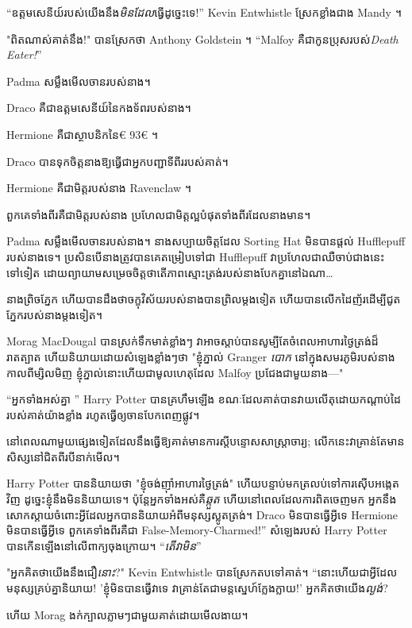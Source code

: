 {{{{“ឧត្តមសេនីយ៍របស់យើងនឹង\emph{មិនដែល}ធ្វើដូច្នេះទេ!” Kevin Entwhistle ស្រែកខ្លាំងជាង Mandy ។

"ពិតណាស់គាត់នឹង!" បានស្រែកថា Anthony Goldstein ។ “Malfoy គឺជាកូនប្រុសរបស់\emph{Death Eater!}”

Padma សម្លឹងមើលចានរបស់នាង។

Draco គឺជាឧត្តមសេនីយ៍នៃកងទ័ពរបស់នាង។

Hermione គឺជាស្ថាបនិកនៃ€ 93€ ។

Draco បាន​ទុក​ចិត្ត​នាង​ឱ្យ​ធ្វើ​ជា​អ្នក​បញ្ជា​ទី​ពីរ​របស់​គាត់។

Hermione គឺជាមិត្តរបស់នាង Ravenclaw ។

ពួកគេទាំងពីរគឺជាមិត្តរបស់នាង ប្រហែលជាមិត្តល្អបំផុតទាំងពីរដែលនាងមាន។

Padma សម្លឹងមើលចានរបស់នាង។ នាងសប្បាយចិត្តដែល Sorting Hat មិនបានផ្តល់ Hufflepuff របស់នាងទេ។ ប្រសិនបើនាងត្រូវបានគេតម្រៀបទៅជា Hufflepuff វាប្រហែលជាឈឺចាប់ជាងនេះទៅទៀត ដោយព្យាយាមសម្រេចចិត្តថាតើភាពស្មោះត្រង់របស់នាងបែកគ្នានៅឯណា…

នាង​ព្រិច​ភ្នែក ហើយ​បាន​ដឹង​ថា​ចក្ខុវិស័យ​របស់​នាង​បាន​ព្រិល​ម្ដង​ទៀត ហើយ​បាន​លើក​ដៃ​ញ័រ​ដើម្បី​ជូត​ភ្នែក​របស់​នាង​ម្ដង​ទៀត។

Morag MacDougal បានស្រក់ទឹកមាត់ខ្លាំងៗ វាអាចស្តាប់បានសូម្បីតែចំពេលអាហារថ្ងៃត្រង់ដ៏រាតត្បាត ហើយនិយាយដោយសំឡេងខ្លាំងៗថា "ខ្ញុំភ្នាល់ Granger \emph{បោក} នៅក្នុងសមរភូមិរបស់នាងកាលពីម្សិលមិញ ខ្ញុំភ្នាល់នោះហើយជាមូលហេតុដែល Malfoy ប្រជែងជាមួយនាង—"

“អ្នកទាំងអស់គ្នា ” Harry Potter បានគ្រហឹមឡើង ខណៈដែលគាត់បានវាយលើតុដោយកណ្តាប់ដៃរបស់គាត់យ៉ាងខ្លាំង រហូតធ្វើឲ្យចានបែកពេញផ្លូវ។

នៅពេលណាមួយផ្សេងទៀតដែលនឹងធ្វើឱ្យគាត់មានការស្តីបន្ទោសសាស្រ្តាចារ្យ; លើក​នេះ​វា​គ្រាន់​តែ​មាន​សិស្ស​នៅ​ជិត​ពីរបី​នាក់​មើល។

Harry Potter បាននិយាយថា "ខ្ញុំចង់ញ៉ាំអាហារថ្ងៃត្រង់" ហើយបន្ទាប់មកត្រលប់ទៅការស៊ើបអង្កេតវិញ ដូច្នេះខ្ញុំនឹងមិននិយាយទេ។ ប៉ុន្តែអ្នកទាំងអស់គឺ\emph{ឆ្កួត} ហើយនៅពេលដែលការពិតចេញមក អ្នកនឹងសោកស្តាយចំពោះអ្វីដែលអ្នកបាននិយាយអំពីមនុស្សស្លូតត្រង់។ Draco មិនបានធ្វើអ្វីទេ Hermione មិនបានធ្វើអ្វីទេ ពួកគេទាំងពីរគឺជា False-Memory-Charmed!” សំឡេងរបស់ Harry Potter បានកើនឡើងនៅលើពាក្យចុងក្រោយ។ “\emph{តើវាមិន}”

"អ្នកគិតថាយើងនឹងជឿ\emph{នោះ}?" Kevin Entwhistle បាន​ស្រែក​តប​ទៅ​គាត់។ “នោះហើយជាអ្វីដែលមនុស្សគ្រប់គ្នានិយាយ! 'ខ្ញុំមិនបានធ្វើវាទេ វាគ្រាន់តែជាមន្តស្នេហ៍ក្លែងក្លាយ!' អ្នកគិតថាយើង\emph{ល្ងង់}?

ហើយ Morag ងក់ក្បាលភ្លាមៗជាមួយគាត់ដោយមើលងាយ។

}}}}
